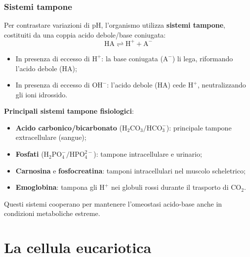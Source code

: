 \documentclass[12pt,a4paper]{report}
\begin{document}
\subsection{Sistemi tampone}
Per contrastare variazioni di pH, l'organismo utilizza \textbf{sistemi tampone}, costituiti da una coppia acido debole/base coniugata:
\[
\mathrm{HA \rightleftharpoons H^+ + A^-}
\]
\begin{itemize}
\item In presenza di eccesso di \(\mathrm{H^+}\): la base coniugata (\(\mathrm{A^-}\)) li lega, riformando l'acido debole (\(\mathrm{HA}\));
\item In presenza di eccesso di \(\mathrm{OH^-}\): l'acido debole (\(\mathrm{HA}\)) cede \(\mathrm{H^+}\), neutralizzando gli ioni idrossido.
\end{itemize}
\textbf{Principali sistemi tampone fisiologici}:
\begin{itemize}
\item \textbf{Acido carbonico/bicarbonato} (\(\mathrm{H_2CO_3/HCO_3^-}\)): principale tampone extracellulare (sangue);
\item \textbf{Fosfati} (\(\mathrm{H_2PO_4^-/HPO_4^{2-}}\)): tampone intracellulare e urinario;
\item \textbf{Carnosina} e \textbf{fosfocreatina}: tamponi intracellulari nel muscolo scheletrico;
\item \textbf{Emoglobina}: tampona gli \(\mathrm{H^+}\) nei globuli rossi durante il trasporto di \(\mathrm{CO_2}\).
\end{itemize}
Questi sistemi cooperano per mantenere l'omeostasi acido-base anche in condizioni metaboliche estreme.

\chapter{La cellula eucariotica}
\end{document}
